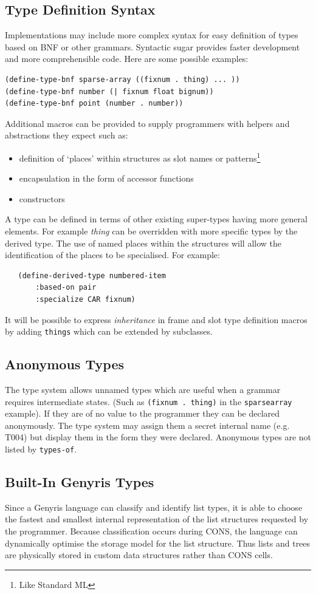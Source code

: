 \documentclass[a4paper,12pt,dvips]{article}
\begin{document}
\subsection{Type Definition Syntax}
\label{sugar}Implementations may include more complex syntax for easy definition of types based on BNF or other grammars. Syntactic sugar provides faster development and more comprehensible code. Here are some possible examples:
\begin{verbatim}
(define-type-bnf sparse-array ((fixnum . thing) ... ))
(define-type-bnf number (| fixnum float bignum)) 
(define-type-bnf point (number . number))
\end{verbatim}
Additional macros can be provided to supply programmers with helpers and abstractions they expect such as:
\begin{itemize}
\item definition of `places' within structures as slot names or patterns\footnote{Like Standard ML}
\item encapsulation in the form of accessor functions
\item constructors
\end{itemize}
A type can be defined in terms of other existing super-types having more general elements. For example \emph{thing} can be overridden with more specific types by the derived type. The use of named places within the structures will allow the identification of the places to be specialised. For example:
\begin{verbatim}
   (define-derived-type numbered-item 
       :based-on pair
       :specialize CAR fixnum)
\end{verbatim}
It will be possible to express \emph{inheritance} in frame and slot type definition macros by adding \texttt{things} which can be extended by subclasses. 
\subsection{Anonymous Types}
The type system allows unnamed types which are useful when a grammar requires intermediate states. (Such as \texttt{(fixnum . thing)} in the \texttt{sparse\-array} example). If they are of no value to the programmer  they can be declared anonymously. The type system may assign them a secret internal name (e.g. T004) but display them in the form they were declared. Anonymous types are not listed by \texttt{types-of}.

\subsection{Built-In Genyris Types}
\label{storage}Since a Genyris language can classify and identify list types, it is able to choose the fastest and smallest internal representation of the list structures requested by the programmer. Because classification occurs during CONS, the language can dynamically optimise the storage model for the list structure. Thus lists and trees are physically stored in custom data structures rather than CONS cells.
\end{document}
